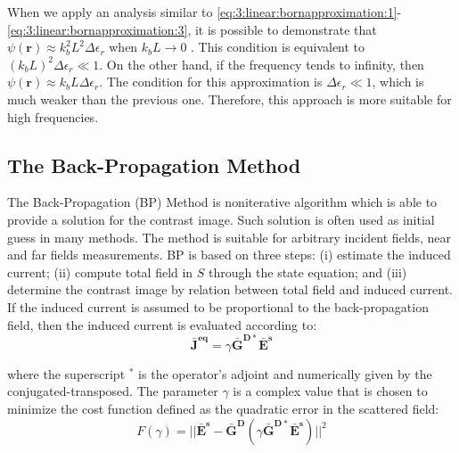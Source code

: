 			When we apply an analysis similar to \eqref{eq:3:linear:bornapproximation:1}-\eqref{eq:3:linear:bornapproximation:3}, it is possible to demonstrate that $\psi(\mathbf{r}) \approx k_b^2L^2\Delta\epsilon_r$ when $k_bL\rightarrow0$ \citep{chew1995}. This condition is equivalent to $(k_bL)^2\Delta\epsilon_r\ll1$. On the other hand, if the frequency tends to infinity, then $\psi(\mathbf{r}) \approx k_bL\Delta\epsilon_r$. The condition for this approximation is $\Delta\epsilon_r \ll 1$, which is much weaker than the previous one. Therefore, this approach is more suitable for high frequencies.
		
		\subsection{The Back-Propagation Method}\label{chap:methods:linear:backpropagation}
		
			The Back-Propagation (BP) Method is noniterative algorithm which is able to provide a solution for the contrast image. Such solution is often used as initial guess in many methods. The method is suitable for arbitrary incident fields, near and far fields measurements. BP is based on three steps: (i) estimate the induced current; (ii) compute total field in $S$ through the state equation; and (iii) determine the contrast image by relation between total field and induced current. If the induced current is assumed to be proportional to the back-propagation field, then the induced current is evaluated according to:
			\begin{equation}
				\mathbf{\bar{J}^{eq}} = \gamma \mathbf{\bar{G}^{D*}} \mathbf{\bar{E}^s} \label{eq:3:linear:bp:J}
			\end{equation}
		
			\noindent where the superscript $\mathbf{^*}$ is the operator's adjoint and numerically given by the conjugated-transposed. The parameter $\gamma$ is a complex value that is chosen to minimize the cost function defined as the quadratic error in the scattered field:
			\begin{equation}
				F(\gamma) = ||\mathbf{\bar{E}^s} - \mathbf{\bar{G}^D}(\gamma\mathbf{\bar{G}^{D*}}\mathbf{\bar{E}^s})||^2 \label{eq:3:linear:bp:F}
			\end{equation}
		
